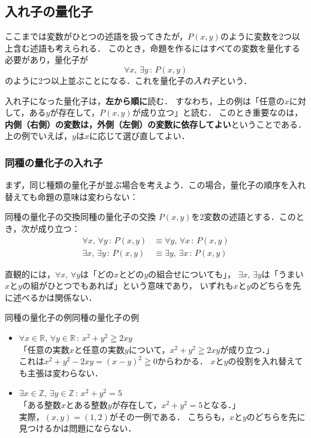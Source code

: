 \subsection{入れ子の量化子}
 
ここまでは変数がひとつの述語を扱ってきたが，$P(x, y)$のように変数を2つ以上含む述語も考えられる．
このとき，命題を作るにはすべての変数を量化する必要があり，量化子が
\[
  \forall x,\, \exists y \, : \, P(x, y)
\]
のように2つ以上並ぶことになる．これを量化子の\emph{入れ子}という．
 
入れ子になった量化子は，\textbf{左から順に}読む．
すなわち，上の例は「任意の$x$に対して，ある$y$が存在して，$P(x, y)$が成り立つ」と読む．
このとき重要なのは，\textbf{内側（右側）の変数は，外側（左側）の変数に依存してよい}ということである．
上の例でいえば，$y$は$x$に応じて選び直してよい．
 
\subsubsection{同種の量化子の入れ子}
 
まず，同じ種類の量化子が並ぶ場合を考えよう．この場合，量化子の順序を入れ替えても命題の意味は変わらない：
 
\begin{prop}{同種の量化子の交換}{同種の量化子の交換}
  $P(x, y)$を2変数の述語とする．このとき，次が成り立つ：
  \begin{align*}
    \forall x,\, \forall y \, : \, P(x, y) & \equiv \forall y,\, \forall x \, : \, P(x, y) \\
    \exists x,\, \exists y \, : \, P(x, y) & \equiv \exists y,\, \exists x \, : \, P(x, y)
  \end{align*}
\end{prop}
 
直観的には，$\forall x,\, \forall y$は「どの$x$とどの$y$の組合せについても」，
$\exists x,\, \exists y$は「うまい$x$と$y$の組がひとつでもあれば」という意味であり，
いずれも$x$と$y$のどちらを先に述べるかは関係ない．
 
\begin{example}{同種の量化子の例}{同種の量化子の例}
  \begin{itemize}
    \item $\forall x \in \mathbb{R},\, \forall y \in \mathbb{R} \, : \, x^2 + y^2 \geqq 2xy$\\
          「任意の実数$x$と任意の実数$y$について，$x^2 + y^2 \geqq 2xy$が成り立つ．」\\
          これは$x^2 + y^2 - 2xy = (x - y)^2 \geqq 0$からわかる．
          $x$と$y$の役割を入れ替えても主張は変わらない．
    \item $\exists x \in \mathbb{Z},\, \exists y \in \mathbb{Z} \, : \, x^2 + y^2 = 5$\\
          「ある整数$x$とある整数$y$が存在して，$x^2 + y^2 = 5$となる．」\\
          実際，$(x, y) = (1, 2)$がその一例である．
          こちらも，$x$と$y$のどちらを先に見つけるかは問題にならない．
  \end{itemize}
\end{example}
 
